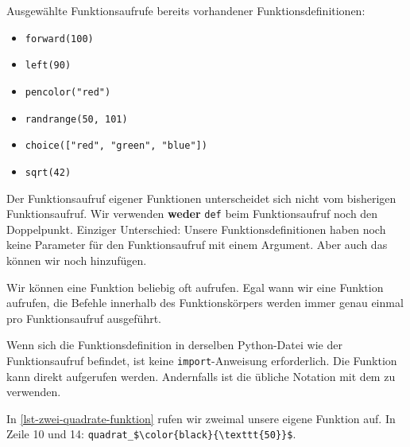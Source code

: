 \begin{example}
Ausgewählte Funktionsaufrufe bereits vorhandener Funktionsdefinitionen:
\begin{multicols}{2}
\begin{itemize}
\item \lstinline[language={python3}]{forward(100)}
\item \lstinline[language={python3}]{left(90)}
\item \lstinline[language={python3}]{pencolor("red")}
\item \lstinline[language={python3}]{randrange(50, 101)}
\item \lstinline[language={python3}]{choice(["red", "green", "blue"])}
\item \lstinline[language={python3}]{sqrt(42)}
\end{itemize}
\end{multicols}
\end{example}

\vspace{-0.5cm}

\begin{hinweis}
Der Funktionsaufruf eigener Funktionen unterscheidet sich nicht vom bisherigen Funktionsaufruf. Wir verwenden \textbf{weder} \lstinline[language={python3}]{def} beim Funktionsaufruf noch den Doppelpunkt. Einziger Unterschied: Unsere Funktionsdefinitionen haben noch keine Parameter für den Funktionsaufruf mit einem Argument. Aber auch das können wir noch hinzufügen.
\end{hinweis}

\vspace{-0.25cm}

Wir können eine Funktion beliebig oft aufrufen. Egal wann wir eine Funktion aufrufen, die Befehle innerhalb des Funktionskörpers werden immer genau einmal pro Funktionsaufruf ausgeführt.

\begin{important}
Wenn sich die Funktionsdefinition in derselben Python-Datei wie der Funktionsaufruf befindet, ist keine  \lstinline[language={python3}]{import}-Anweisung erforderlich. Die Funktion kann direkt aufgerufen werden. Andernfalls ist die übliche Notation mit dem  zu verwenden.
\end{important}

\begin{example}

In \autoref{lst-zwei-quadrate-funktion} rufen wir zweimal unsere eigene Funktion auf. In Zeile \num{10} und \num{14}: \lstinline[language={python3}, mathescape]!quadrat_$\color{black}{\texttt{50}}$!.

\end{example}

